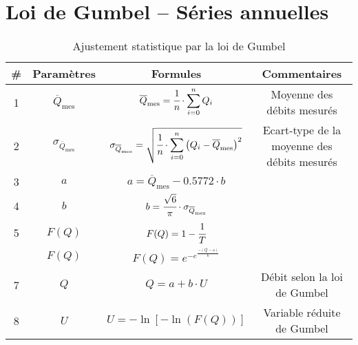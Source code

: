 \section{Loi de Gumbel -- Séries annuelles}
\begin{table}[H]
    \centering
    \begin{tabular}{c|cc|c}
        \# & \textbf{Paramètres}                & \textbf{Formules}                                                                                                                         & \textbf{Commentaires}      \\
        \hline
        1  & $\overline{Q}_\text{mes}$          & $\overline{Q}_\text{mes} = \cfrac{1}{n} \cdot \displaystyle{\sum_{i=0}^{n} Q_i}$                                                          & Moyenne des débits mesurés \\
        \hline
        2  & $\sigma_{\overline{Q}_\text{mes}}$ & $\sigma_{\overline{Q}_\text{mes}} = \sqrt{\cfrac{1}{n} \cdot \displaystyle{\sum_{i=0}^{n} \left(Q_i - \overline{Q}_\text{mes}\right)^2}}$ & Ecart-type de la moyenne des débits mesurés \\
        \hline
        3  & $a$                                & $a = \overline{Q}_\text{mes} - 0.5772 \cdot b$                                                                                            & \\
        \hline
        4  & $b$                                & $b = \cfrac{\sqrt{6}}{\pi} \cdot \sigma_{\overline{Q}_\text{mes}}$                                                                        & \\
        \hline
        5  & $F(Q)$                             & $F(Q) = 1-\cfrac{1}{T}$                                                                                                                   & \\
        \hdashline                   
        6  & $F(Q)$                             & $F(Q) = e^{-e^{\frac{- \left(Q-a\right)}{b}}}$                                                                                            & \\
        \hline
        7  & $Q$                                & $Q = a + b \cdot U$                                                                                                                       & Débit selon la loi de Gumbel \\
        \hline
        8  & $U$                                & $U = -\ln \left[ -\ln \left(F(Q)\right)\right]$                                                                                          & Variable réduite de Gumbel   \\
    \end{tabular}
    \caption{Ajustement statistique par la loi de Gumbel}
    \label{tab:loiGumbel}
\end{table}


